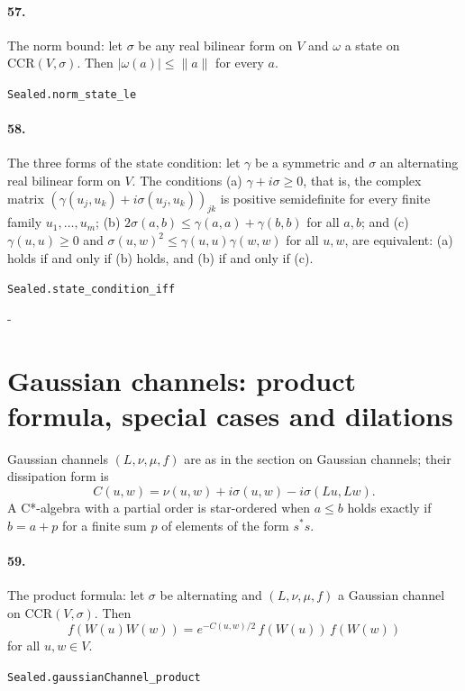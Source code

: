 \documentclass[11pt]{article}
\makeatletter
\newcommand{\keepspace}[1]{\par\penalty-100\begingroup\setlength{\dimen@}{#1}\dimen@ii\pagegoal\advance\dimen@ii-\pagetotal\ifdim\dimen@>\dimen@ii\ifdim\dimen@ii>\z@\vfil\fi\break\fi\endgroup}
\makeatother
\begin{document}
\paragraph{57.} The norm bound: let $\sigma$ be any real bilinear form on $V$ and $\omega$ a state on $\mathrm{CCR}(V, \sigma)$. Then $|\omega(a)| \le \|a\|$ for every $a$.\par{\footnotesize\texttt{Sealed.norm\_state\_le}}

\paragraph{58.} The three forms of the state condition: let $\gamma$ be a symmetric and $\sigma$ an alternating real bilinear form on $V$. The conditions (a) $\gamma + i\sigma \ge 0$, that is, the complex matrix $(\gamma(u_j, u_k) + i\sigma(u_j, u_k))_{jk}$ is positive semidefinite for every finite family $u_1, \dots, u_m$; (b) $2\sigma(a, b) \le \gamma(a, a) + \gamma(b, b)$ for all $a, b$; and (c) $\gamma(u, u) \ge 0$ and $\sigma(u, w)^2 \le \gamma(u, u)\gamma(w, w)$ for all $u, w$, are equivalent: (a) holds if and only if (b) holds, and (b) if and only if (c).\par{\footnotesize\texttt{Sealed.state\_condition\_iff}}

\keepspace{14\baselineskip}\section*{Gaussian channels: product formula, special cases and dilations}
Gaussian channels $(L, \nu, \mu, f)$ are as in the section on Gaussian channels; their dissipation form is \[C(u, w) = \nu(u, w) + i\sigma(u, w) - i\sigma(Lu, Lw).\] A C*-algebra with a partial order is star-ordered when $a \le b$ holds exactly if $b = a + p$ for a finite sum $p$ of elements of the form $s^* s$.

\paragraph{59.} The product formula: let $\sigma$ be alternating and $(L, \nu, \mu, f)$ a Gaussian channel on $\mathrm{CCR}(V, \sigma)$. Then \[f(W(u) W(w)) = e^{-C(u, w)/2}\, f(W(u))\, f(W(w))\] for all $u, w \in V$.\par{\footnotesize\texttt{Sealed.gaussianChannel\_product}}
\end{document}
